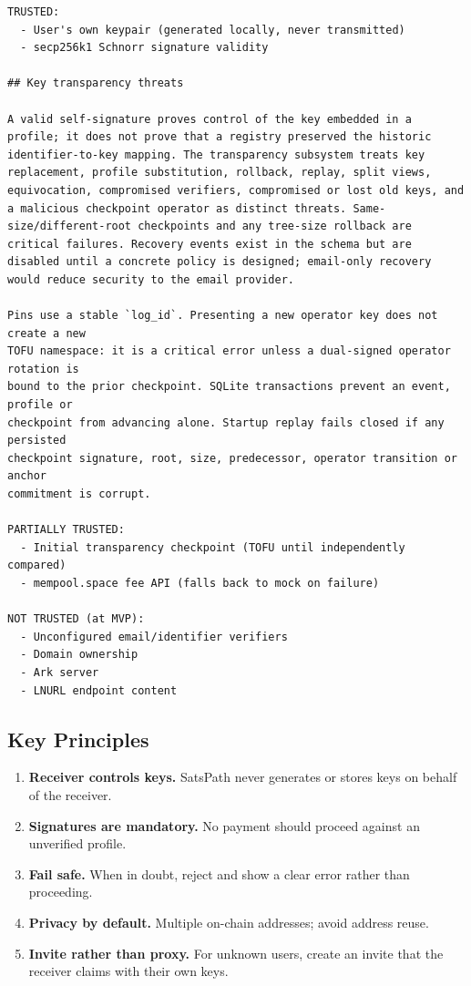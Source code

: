 \documentclass[
]{article}
\providecommand{\tightlist}{%
  \setlength{\itemsep}{0pt}\setlength{\parskip}{0pt}}
\begin{document}
\begin{verbatim}
TRUSTED:
  - User's own keypair (generated locally, never transmitted)
  - secp256k1 Schnorr signature validity

## Key transparency threats

A valid self-signature proves control of the key embedded in a profile; it does not prove that a registry preserved the historic identifier-to-key mapping. The transparency subsystem treats key replacement, profile substitution, rollback, replay, split views, equivocation, compromised verifiers, compromised or lost old keys, and a malicious checkpoint operator as distinct threats. Same-size/different-root checkpoints and any tree-size rollback are critical failures. Recovery events exist in the schema but are disabled until a concrete policy is designed; email-only recovery would reduce security to the email provider.

Pins use a stable `log_id`. Presenting a new operator key does not create a new
TOFU namespace: it is a critical error unless a dual-signed operator rotation is
bound to the prior checkpoint. SQLite transactions prevent an event, profile or
checkpoint from advancing alone. Startup replay fails closed if any persisted
checkpoint signature, root, size, predecessor, operator transition or anchor
commitment is corrupt.

PARTIALLY TRUSTED:
  - Initial transparency checkpoint (TOFU until independently compared)
  - mempool.space fee API (falls back to mock on failure)

NOT TRUSTED (at MVP):
  - Unconfigured email/identifier verifiers
  - Domain ownership
  - Ark server
  - LNURL endpoint content
\end{verbatim}

\hypertarget{key-principles}{%
\subsection{Key Principles}\label{key-principles}}

\begin{enumerate}
\def\labelenumi{\arabic{enumi}.}
\tightlist
\item
  \textbf{Receiver controls keys.} SatsPath never generates or stores
  keys on behalf of the receiver.
\item
  \textbf{Signatures are mandatory.} No payment should proceed against
  an unverified profile.
\item
  \textbf{Fail safe.} When in doubt, reject and show a clear error
  rather than proceeding.
\item
  \textbf{Privacy by default.} Multiple on-chain addresses; avoid
  address reuse.
\item
  \textbf{Invite rather than proxy.} For unknown users, create an invite
  that the receiver claims with their own keys.
\end{enumerate}
\end{document}
